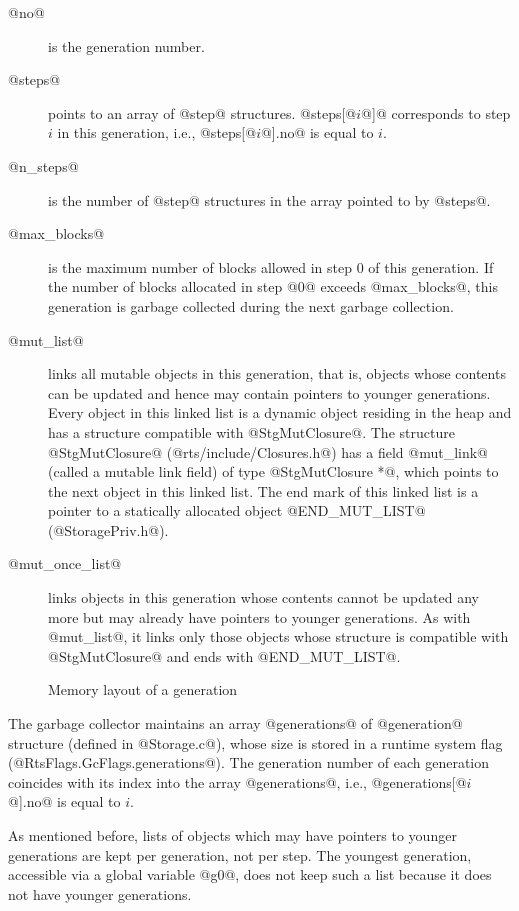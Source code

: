 \documentclass{article}
\begin{document}
\begin{description}
\item[@no@] is the generation number.
\item[@steps@] points to an array of @step@ structures. @steps[@$i$@]@ 
corresponds to step $i$ in this generation, i.e., 
@steps[@$i$@].no@ is equal to $i$.
\item[@n\_steps@] is the number of @step@ structures in the array pointed to 
by @steps@.
\item[@max\_blocks@] is the maximum number of blocks allowed in step $0$ of
this generation. If the number of blocks allocated 
in step @0@ exceeds @max_blocks@,
this generation is garbage collected during the next garbage collection.
\item[@mut\_list@] links all mutable objects in this generation, that is,
objects whose contents can be updated and hence may contain pointers to
younger generations. 
Every object in this linked list is a dynamic object residing in the heap 
and has a structure compatible with @StgMutClosure@.
The structure @StgMutClosure@ (@rts/include/Closures.h@) has a field 
@mut_link@ (called a mutable link field) of type @StgMutClosure *@, which
points to the next object in this linked list.
The end mark of this linked list is a pointer to a statically allocated object 
@END_MUT_LIST@ (@StoragePriv.h@).
\item[@mut\_once\_list@] links objects in this generation whose contents 
cannot be updated any more but may already have pointers to younger generations.
As with @mut_list@, it links only those objects whose structure is compatible
with @StgMutClosure@ and ends with @END_MUT_LIST@.
\end{description}

\begin{figure}[ht]
\begin{center}

\caption{Memory layout of a generation}
\label{fig-gen}
\end{center}
\end{figure}

The garbage collector maintains an array @generations@ of @generation@ structure
(defined in @Storage.c@), whose size is stored in a runtime system flag 
(@RtsFlags.GcFlags.generations@). 
The generation number of each generation coincides with its index into
the array @generations@, i.e.,  @generations[@$i$@].no@ is equal to $i$.

As mentioned before, lists of objects which may have pointers to younger
generations are kept per generation, not per step. The youngest generation,
accessible via a global variable @g0@, does not keep such a list because it
does not have younger generations.
\end{document}
